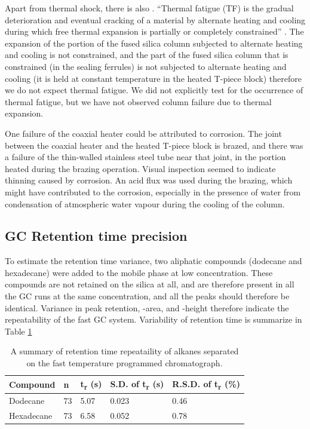 Apart from thermal shock, there is also . ``Thermal
fatigue (TF) is the gradual deterioration and eventual cracking of a material by
alternate heating and cooling during which free thermal expansion is partially
or completely constrained'' \autocite{Rao2001}. The expansion of the portion of
the fused silica column subjected to alternate heating and cooling is not
constrained, and the part of the fused silica column that is constrained (in the
sealing ferrules) is not subjected to alternate heating and cooling (it is held
at constant temperature in the heated T-piece block) therefore we do not expect
thermal fatigue. We did not explicitly test for the occurrence of thermal
fatigue, but we have not observed column failure due to thermal expansion.

One failure of the coaxial heater could be attributed to corrosion. The joint
between the coaxial heater and the heated T-piece block is brazed, and there was
a failure of the thin-walled stainless steel tube near that joint, in the
portion heated during the brazing operation. Visual inspection seemed to
indicate thinning caused by corrosion. An acid flux was used during the brazing,
which might have contributed to the corrosion, especially in the presence of
water from condensation of atmospheric water vapour during the cooling of the
column.

\subsection{GC Retention time precision}

To estimate the retention time variance, two aliphatic compounds (dodecane and
hexadecane) were added to the mobile phase at low concentration. These compounds
are not retained on the silica at all, and are therefore present in all the GC
runs at the same concentration, and all the peaks should therefore be identical.
Variance in peak retention, -area, and -height therefore indicate the
repeatability of the fast GC system. Variability of retention time is summarize
in Table \ref{tab:RetentionTimeVariance}

\begin{table}

\caption{\label{tab:RetentionTimeVariance}A summary of retention time repeataility of alkanes
separated on the fast temperature programmed chromatograph.}


\begin{tabular}{lllll}
Compound & n & t\textsubscript{r} (s) & S.D. of t\textsubscript{r} (s)& R.S.D. of t\textsubscript{r} (\%)\\
\hline
Dodecane & 73 & 5.07 & 0.023 & 0.46\\
Hexadecane & 73 & 6.58 & 0.052 & 0.78\\
\end{tabular}

\end{table}

